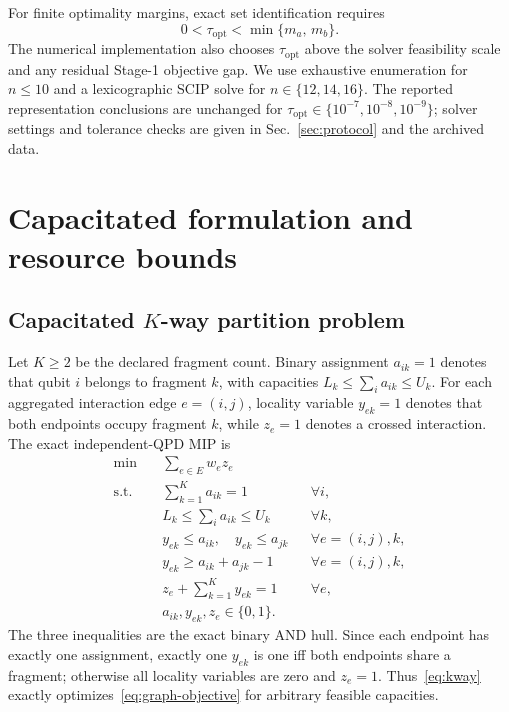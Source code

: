 \documentclass[
  aps,
  pra,
  reprint,
  amsmath,
  amssymb,
  longbibliography,
  nofootinbib,
  floatfix
]{revtex4-2}
\theoremstyle{plain}
\begin{document}
For finite optimality margins, exact set identification requires
\begin{equation}
  0 < \tau_{\mathrm{opt}} < \min\{m_a,\,m_b\}.
  \label{eq:tau-hierarchy}
\end{equation}
The numerical implementation also chooses $\tau_{\mathrm{opt}}$ above the solver feasibility scale and any residual Stage-1 objective gap. We use exhaustive enumeration for $n\le10$ and a lexicographic SCIP solve for $n\in\{12,14,16\}$. The reported representation conclusions are unchanged for $\tau_{\mathrm{opt}}\in\{10^{-7},10^{-8},10^{-9}\}$; solver settings and tolerance checks are given in Sec.~\ref{sec:protocol} and the archived data.

\section{Capacitated formulation and resource bounds}
\label{sec:opt}

\subsection{Capacitated \texorpdfstring{$K$}{K}-way partition problem}

Let $K\geq2$ be the declared fragment count. Binary assignment $a_{ik}=1$ denotes that qubit $i$ belongs to fragment $k$, with capacities $L_k\leq\sum_i a_{ik}\leq U_k$. For each aggregated interaction edge $e=(i,j)$, locality variable $y_{ek}=1$ denotes that both endpoints occupy fragment $k$, while $z_e=1$ denotes a crossed interaction. The exact independent-QPD MIP is
\begin{equation}
\begin{aligned}
\min\quad & \sum_{e\in E} w_e z_e\\
\text{s.t.}\quad & \sum_{k=1}^{K} a_{ik}=1 && \forall i,\\
& L_k\leq\sum_i a_{ik}\leq U_k && \forall k,\\
& y_{ek}\leq a_{ik},\quad y_{ek}\leq a_{jk} && \forall e=(i,j),k,\\
& y_{ek}\geq a_{ik}+a_{jk}-1 && \forall e=(i,j),k,\\
& z_e+\sum_{k=1}^{K}y_{ek}=1 && \forall e,\\
& a_{ik},y_{ek},z_e\in\{0,1\}.&
\end{aligned}
\label{eq:kway}
\end{equation}
The three inequalities are the exact binary AND hull. Since each endpoint has exactly one assignment, exactly one $y_{ek}$ is one iff both endpoints share a fragment; otherwise all locality variables are zero and $z_e=1$. Thus~\eqref{eq:kway} exactly optimizes~\eqref{eq:graph-objective} for arbitrary feasible capacities.
\end{document}
